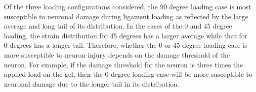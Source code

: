 \documentclass[]{interact}
\begin{document}
Of the three loading configurations considered, the 90 degree loading case is most susceptible to neuronal damage during ligament loading as reflected by the large average and long tail of its distribution. In the cases of the 0 and 45 degree loading, the strain distribution for 45 degrees has a larger average while that for 0 degrees has a longer tail. Therefore, whether the 0 or 45 degree loading case is more susceptible to neuron injury depends on the damage threshold of the neuron. For example, if the damage threshold for the neuron is three times the applied load on the gel, then the 0 degree loading case will be more susceptible to neuronal damage due to the longer tail in its distribution.


%
\end{document}
